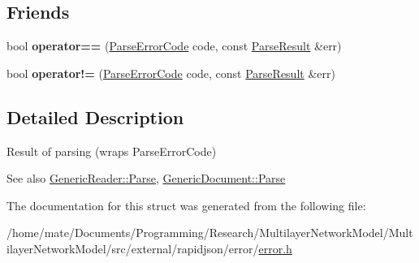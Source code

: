 \subsection*{Friends}
\begin{DoxyCompactItemize}
\item 
bool {\bfseries operator==} (\hyperlink{group__RAPIDJSON__ERRORS_ga8d4b32dfc45840bca189ade2bbcb6ba7}{Parse\+Error\+Code} code, const \hyperlink{structParseResult}{Parse\+Result} \&err)\hypertarget{structParseResult_a58c9982e833d1c74686506ac7449200c}{}\label{structParseResult_a58c9982e833d1c74686506ac7449200c}

\item 
bool {\bfseries operator!=} (\hyperlink{group__RAPIDJSON__ERRORS_ga8d4b32dfc45840bca189ade2bbcb6ba7}{Parse\+Error\+Code} code, const \hyperlink{structParseResult}{Parse\+Result} \&err)\hypertarget{structParseResult_a0498aebcfdd3d4a5dcb989ee29b93d4d}{}\label{structParseResult_a0498aebcfdd3d4a5dcb989ee29b93d4d}

\end{DoxyCompactItemize}


\subsection{Detailed Description}
Result of parsing (wraps Parse\+Error\+Code) 


 \begin{DoxySeeAlso}{See also}
\hyperlink{classGenericReader_a0c450620d14ff1824e58bb7bd9b42099}{Generic\+Reader\+::\+Parse}, \hyperlink{classGenericDocument_aadee36db7064cc9894a75c848831cdae}{Generic\+Document\+::\+Parse} 
\end{DoxySeeAlso}


The documentation for this struct was generated from the following file\+:\begin{DoxyCompactItemize}
\item 
/home/mate/\+Documents/\+Programming/\+Research/\+Multilayer\+Network\+Model/\+Multilayer\+Network\+Model/src/external/rapidjson/error/\hyperlink{error_8h}{error.\+h}\end{DoxyCompactItemize}
